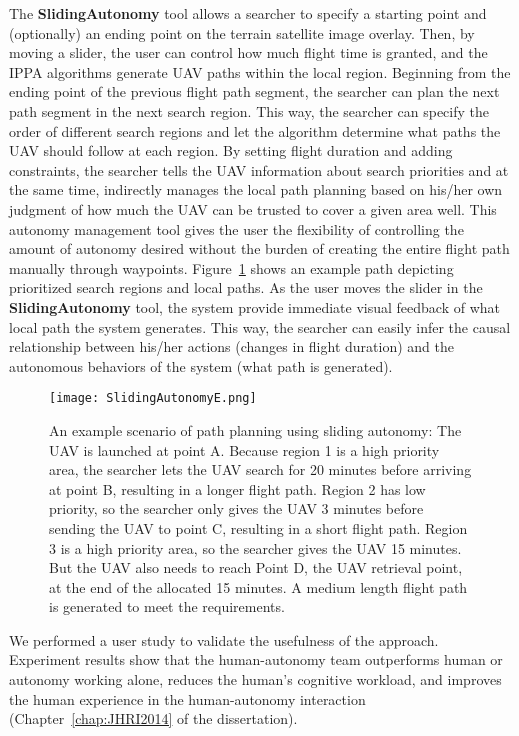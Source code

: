 The \textbf{SlidingAutonomy} tool allows a searcher to specify a starting point and (optionally) an ending point on the terrain satellite image overlay. Then, by moving a slider, the user can control how much flight time is granted, and the IPPA algorithms generate UAV paths within the local region. Beginning from the ending point of the previous flight path segment, the searcher can plan the next path segment in the next search region. This way, the searcher can specify the order of different search regions and let the algorithm determine what paths the UAV should follow at each region. By setting flight duration and adding constraints, the searcher tells the UAV information about search priorities and at the same time, indirectly manages the local path planning based on his/her own judgment of how much the UAV can be trusted to cover a given area well. This autonomy management tool gives the user the flexibility of controlling the amount of autonomy desired without the burden of creating the entire flight path manually through waypoints. Figure~\ref{SlidingAutonomy} shows an example path depicting prioritized search regions and local paths. As the user moves the slider in the \textbf{SlidingAutonomy} tool, the system provide immediate visual feedback of what local path the system generates. This way, the searcher can easily infer the causal relationship between his/her actions (changes in flight duration) and the autonomous behaviors of the system (what path is generated). 

\begin{figure}
\centering
\texttt{[image: SlidingAutonomyE.png]}
\caption[An example scenario of path planning using sliding autonomy]{An example scenario of path planning using sliding autonomy: The UAV is launched at point A. Because region 1 is a high priority area, the searcher lets the UAV search for 20 minutes before arriving at point B, resulting in a longer flight path. Region 2 has low priority, so the searcher only gives the UAV 3 minutes before sending the UAV to point C, resulting in a short flight path. Region 3 is a high priority area, so the searcher gives the UAV 15 minutes. But the UAV also needs to reach Point D, the UAV retrieval point, at the end of the allocated 15 minutes. A medium length flight path is generated to meet the requirements.}
\label{SlidingAutonomy}
\end{figure}

We performed a user study to validate the usefulness of the approach. Experiment results show that the human-autonomy team outperforms human or autonomy working alone, reduces the human's cognitive workload, and improves the human experience in the human-autonomy interaction (Chapter~\ref{chap:JHRI2014} of the dissertation).


